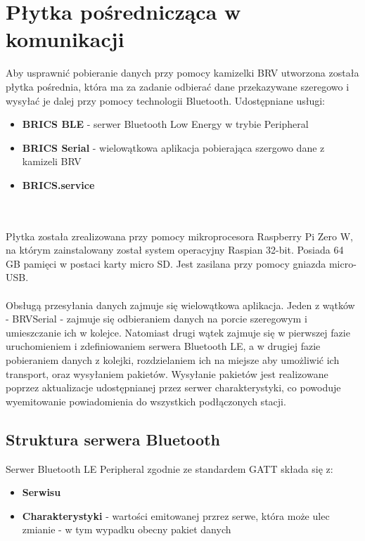 \chapter{Płytka pośrednicząca w komunikacji}
    Aby usprawnić pobieranie danych przy pomocy kamizelki BRV utworzona została płytka pośrednia, która ma za zadanie odbierać dane przekazywane szeregowo i wysyłać je dalej przy pomocy technologii Bluetooth.
    Udostępniane usługi:
    \begin{itemize}
        \item {\textbf{BRICS BLE} - serwer Bluetooth Low Energy w trybie Peripheral}
        \item {\textbf{BRICS Serial} - wielowątkowa aplikacja pobierająca szergowo dane z kamizeli BRV}
        \item {\textbf{BRICS.service}}
    \end{itemize}
    \\ \\
    Płytka została zrealizowana przy pomocy mikroprocesora Raspberry Pi Zero W, na którym zainstalowany został system operacyjny Raspian 32-bit. Posiada 64 GB pamięci w postaci karty micro SD. Jest zasilana przy pomocy gniazda micro-USB.
    \\ \\
    Obsługą przesyłania danych zajmuje się wielowątkowa aplikacja. Jeden z wątków - BRVSerial - zajmuje się odbieraniem danych na porcie szeregowym i umieszczanie ich w kolejce.
    Natomiast drugi wątek zajmuje się w pierwszej fazie uruchomieniem i zdefiniowaniem serwera Bluetooth LE, a w drugiej fazie pobieraniem danych z kolejki, rozdzielaniem ich na miejsze aby umożliwić ich transport, oraz wysyłaniem pakietów. Wysyłanie pakietów jest realizowane poprzez aktualizacje udostępnianej przez serwer charakterystyki, co powoduje wyemitowanie powiadomienia do wszystkich podłączonych stacji.
\section {Struktura serwera Bluetooth}
    Serwer Bluetooth LE Peripheral zgodnie ze standardem GATT składa się z:
    \begin{itemize}
        \item {\textbf{Serwisu}}
        \item {\textbf{Charakterystyki} - wartości emitowanej przrez serwe, która może ulec zmianie - w tym wypadku obecny pakiet danych}
    \end{itemize}
    
